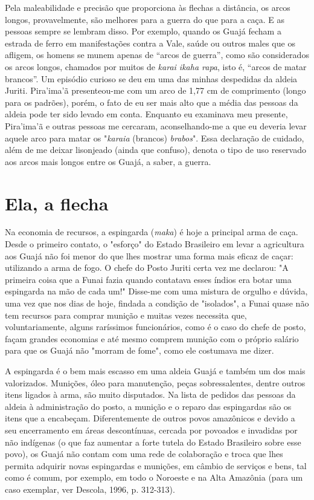Pela maleabilidade e precisão que proporciona às flechas a distância, os
arcos longos, provavelmente, são melhores para a guerra do que para a
caça. E as pessoas sempre se lembram disso. Por exemplo, quando os Guajá
fecham a estrada de ferro em manifestações contra a Vale, saúde ou
outros males que os afligem, os homens se munem apenas de ``arcos de
guerra'', como são considerados os arcos longos, chamados por muitos de
\emph{karai ikaha rapa}, isto é, ``arcos de matar brancos''. Um episódio
curioso se deu em uma das minhas despedidas da aldeia Juriti. Pira'ima'ã
presenteou-me com um arco de 1,77 cm de comprimento (longo para os
padrões), porém, o fato de eu ser mais alto que a média das pessoas da
aldeia pode ter sido levado em conta. Enquanto eu examinava meu
presente, Pira'ima'ã e outras pessoas me cercaram, aconselhando-me a que
eu deveria levar aquele arco para matar os "\emph{karaia} (brancos)
\emph{brabos}". Essa declaração de cuidado, além de me deixar lisonjeado
(ainda que confuso), denota o tipo de uso reservado aos arcos mais
longos entre os Guajá, a saber, a guerra.

\section{Ela, a flecha}\label{ela-a-flecha}

Na economia de recursos, a espingarda (\emph{maka}) é hoje a principal
arma de caça. Desde o primeiro contato, o "esforço" do Estado Brasileiro
em levar a agricultura aos Guajá não foi menor do que lhes mostrar uma
forma mais eficaz de caçar: utilizando a arma de fogo. O chefe do Posto
Juriti certa vez me declarou: "A primeira coisa que a Funai fazia quando
contatava esses índios era botar uma espingarda na mão de cada um!"
Disse-me com uma mistura de orgulho e dúvida, uma vez que nos dias de
hoje, findada a condição de "isolados", a Funai quase não tem recursos
para comprar munição e muitas vezes necessita que, voluntariamente,
alguns raríssimos funcionários, como é o caso do chefe de posto, façam
grandes economias e até mesmo comprem munição com o próprio salário para
que os Guajá não "morram de fome", como ele costumava me dizer.

A espingarda é o bem mais escasso em uma aldeia Guajá e também um dos
mais valorizados. Munições, óleo para manutenção, peças sobressalentes,
dentre outros itens ligados à arma, são muito disputados. Na lista de
pedidos das pessoas da aldeia à administração do posto, a munição e o
reparo das espingardas são os itens que a encabeçam. Diferentemente de
outros povos amazônicos e devido a seu encerramento em áreas
descontínuas, cercada por povoados e invadidas por não indígenas (o que
faz aumentar a forte tutela do Estado Brasileiro sobre esse povo), os
Guajá não contam com uma rede de colaboração e troca que lhes permita
adquirir novas espingardas e munições, em câmbio de serviços e bens, tal
como é comum, por exemplo, em todo o Noroeste e na Alta Amazônia (para
um caso exemplar, ver Descola, 1996, p. 312-313).

